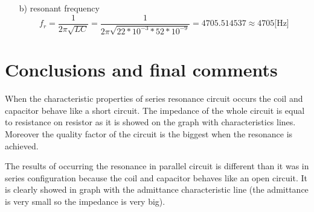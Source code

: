 \documentclass[]{scrartcl}
\begin{document}
\begin{itemize}
    \item[b)]resonant frequency
    \begin{equation}
        f_r=\frac{1}{2\pi\sqrt{LC}}=\frac{1}{2\pi\sqrt{22*10^{-3}*52*10^{-9}}}=4705.514537\approx4705\text{[Hz]}
    \end{equation}
\end{itemize}

\section{Conclusions and final comments}

\begin{flushleft}
    When the characteristic properties of series resonance circuit occurs the coil and capacitor behave like a short circuit. The impedance of the whole circuit is equal to resistance on resistor as it is showed on the graph with characteristics lines. Moreover the quality factor of the circuit is the biggest when the resonance is achieved.    
\end{flushleft}

\begin{flushleft}
    The results of occurring the resonance in parallel circuit is different than it was in series configuration because the coil and capacitor behaves like an open circuit. It is clearly showed in graph with the admittance characteristic line (the admittance is very small so the impedance is very big). 
\end{flushleft}
\end{document}
